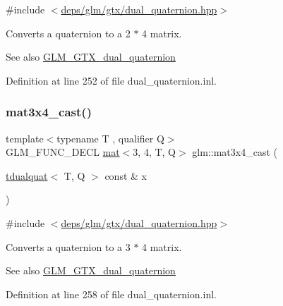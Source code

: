{\ttfamily \#include $<$\hyperlink{dual__quaternion_8hpp}{deps/glm/gtx/dual\+\_\+quaternion.\+hpp}$>$}

Converts a quaternion to a 2 $\ast$ 4 matrix.

\begin{DoxySeeAlso}{See also}
\hyperlink{group__gtx__dual__quaternion}{G\+L\+M\+\_\+\+G\+T\+X\+\_\+dual\+\_\+quaternion} 
\end{DoxySeeAlso}


Definition at line 252 of file dual\+\_\+quaternion.\+inl.

\mbox{\label{group__gtx__dual__quaternion_gaf59f5bb69620d2891c3795c6f2639179}} 
\subsubsection{\texorpdfstring{mat3x4\+\_\+cast()}{mat3x4\_cast()}}
{\footnotesize\ttfamily template$<$typename T , qualifier Q$>$ \\
G\+L\+M\+\_\+\+F\+U\+N\+C\+\_\+\+D\+E\+CL \hyperlink{structglm_1_1mat}{mat}$<$3, 4, T, Q$>$ glm\+::mat3x4\+\_\+cast (\begin{DoxyParamCaption}\item[{\hyperlink{structglm_1_1tdualquat}{tdualquat}$<$ T, Q $>$ const \&}]{x }\end{DoxyParamCaption})}



{\ttfamily \#include $<$\hyperlink{dual__quaternion_8hpp}{deps/glm/gtx/dual\+\_\+quaternion.\+hpp}$>$}

Converts a quaternion to a 3 $\ast$ 4 matrix.

\begin{DoxySeeAlso}{See also}
\hyperlink{group__gtx__dual__quaternion}{G\+L\+M\+\_\+\+G\+T\+X\+\_\+dual\+\_\+quaternion} 
\end{DoxySeeAlso}


Definition at line 258 of file dual\+\_\+quaternion.\+inl.

\mbox{\label{group__gtx__dual__quaternion_ga299b8641509606b1958ffa104a162cfe}} 
